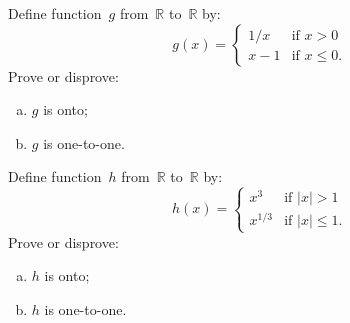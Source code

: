 \begin{exercise}{} \label{OntoCasesExer2}
 Define function~$g$ from~$\mathbb{R}$ to~$\mathbb{R}$ by:
$$ g(x) = 
\begin{cases}
1/x & \mbox{if $x > 0$} \\
x - 1 & \mbox{if $x \le 0$}
 . \end{cases} $$
Prove or disprove:
\begin{multicols}{2}
 \begin{enumerate}[(a)]
 \item \label{OntoCasesExer-gNotOnto}
 $g$ is onto;
 \item \label{OntoCasesExer-g11} 
 $g$ is one-to-one.
\end{enumerate}
\end{multicols}
\end{exercise}

\begin{exercise}{} \label{OntoCasesExer2}
 Define function~$h$ from~$\mathbb{R}$ to~$\mathbb{R}$ by:
$$ h(x) = 
\begin{cases}
x^{3} & \mbox{if $|x| > 1$} \\
x^{1/3} & \mbox{if $|x| \le 1$}
 . \end{cases} $$
Prove or disprove:
\begin{multicols}{2}
 \begin{enumerate}[(a)]
 \item \label{OntoCasesExer-gNotOnto}
 $h$ is onto;
 \item \label{OntoCasesExer-g11} 
 $h$ is one-to-one.
\end{enumerate}
\end{multicols}
\end{exercise}





